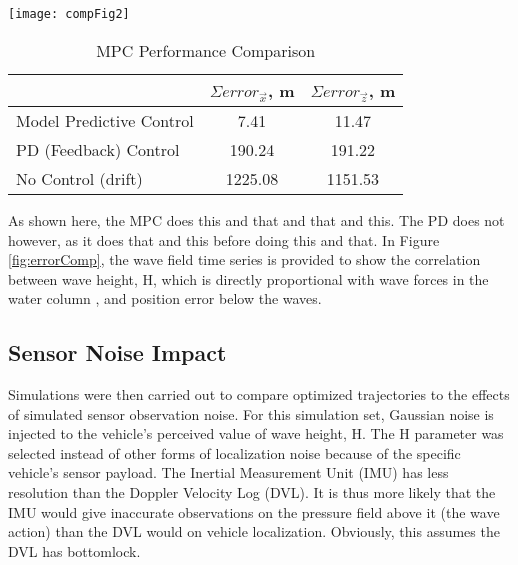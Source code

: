 \documentclass[letterpaper, 10 pt, conferences]{ieeeconf}  %
\begin{document}
\begin{figure*}
\texttt{[image: compFig2]}
\centering
\caption{Position errors in global $\vec{x}$ and $\vec{z}$ coordinates when comparing a traditional feedback controller with a model predictive controller. As shown, MPC returns error values one order of magnitude lower than PD Control. Summed error values for these results are shown in Table \ref{table:errorSum}.} 
\label{fig:errorComp}
\end{figure*}

\begin{table}[h]
\caption{MPC Performance Comparison}
\begin{center}
\def\arraystretch{1.1}%
\begin{tabular}{ |l|c|c| } 
 \hline 
  & $\Sigma error_\vec{x}$, m & $\Sigma error_\vec{z}$, m \\ 
 \hline
 Model Predictive Control & 7.41 & 11.47 \\ 
 PD (Feedback) Control & 190.24 & 191.22 \\ 
 No Control (drift) & 1225.08 & 1151.53 \\
 \hline
\end{tabular}
\end{center}
\label{table:errorSum}
\end{table}

As shown here, the MPC does this and that and that and this. The PD does not however, as it does that and this before doing this and that. In Figure \ref{fig:errorComp}, the wave field time series is provided to show the correlation between wave height, H, which is directly proportional with wave forces in the water column \cite{D&D}, and position error below the waves. 

\subsection{Sensor Noise Impact} \label{results:noise}

Simulations were then carried out to compare optimized trajectories to the effects of simulated sensor observation noise. For this simulation set, Gaussian noise is injected to the vehicle's perceived value of wave height, H. The H parameter was selected instead of other forms of localization noise because of the specific vehicle's sensor payload. The Inertial Measurement Unit (IMU) has less resolution than the Doppler Velocity Log (DVL). It is thus more likely that the IMU would give inaccurate observations on the pressure field above it (the wave action) than the DVL would on vehicle localization. Obviously, this assumes the DVL has bottomlock. 
\end{document}

